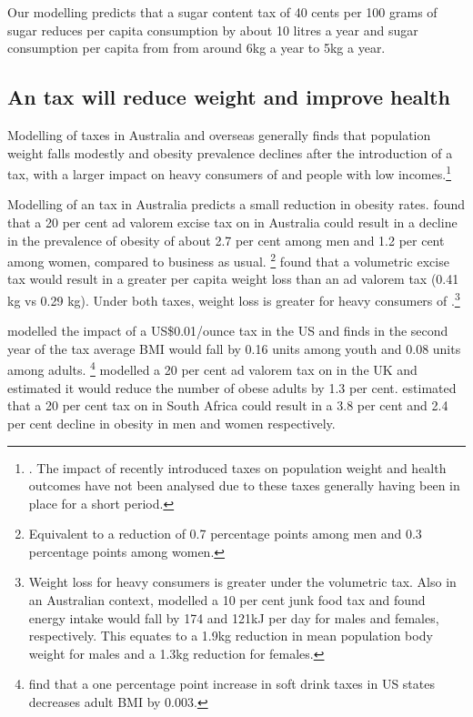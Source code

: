 \documentclass[embargoed]{grattan}
\begin{document}
Our modelling predicts that a sugar content tax of 40 cents per 100 grams of sugar reduces per capita \SSB{} consumption by about 10 litres a year and sugar consumption per capita from \SSBs{} from around 6kg a year to 5kg a year.

\subsection{An \SSB{} tax will reduce weight and improve health}\label{an-ssb-tax-will-reduce-weight-and-improve-health}

Modelling of \SSB{} taxes in Australia and overseas generally finds that population weight falls modestly and obesity prevalence declines after the introduction of a tax, with a larger impact on heavy consumers of \SSBs{} and people with low incomes.\footnote{\textcites{Briggs2013Overallincomespecific}{Manyema2014potentialimpact20}{Organization2016FiscalPoliciesDiet}{Veerman2016ImpactTaxSugar}{Sharma2014effectstaxingsugarsweetened}{Andreyeva2011Estimatingpotentialtaxes}.
The impact of recently introduced \SSB{} taxes on population weight and health outcomes have not been analysed due to these taxes generally having been in place for a short period.}

Modelling of an \SSB{} tax in Australia predicts a small reduction in obesity rates. \textcite{Veerman2016ImpactTaxSugar} found that a 20 per cent ad valorem excise tax on \SSBs{} in Australia could result in a decline in the prevalence of obesity of about 2.7 per cent among men and 1.2 per cent among women, compared to business as usual.%
\footnote{Equivalent to a reduction of 0.7 percentage points among men and 0.3 percentage points among women.} 
\textcite{Sharma2014effectstaxingsugarsweetened} found that a volumetric excise tax would result in a greater per capita weight loss than an ad valorem tax (0.41 kg vs 0.29 kg).
Under both taxes, weight loss is greater for heavy consumers of \SSBs{}.\footnote{Weight loss for heavy consumers is greater under the volumetric tax. Also in an Australian context, \textcite{Sacks2011Statesshouldstand} modelled a 10 per cent junk food tax and found energy intake would fall by 174 and 121kJ per day for males and females, respectively.
This equates to a 1.9kg reduction in mean population body weight for males and a 1.3kg reduction for females.}

\textcite{Long2015Costeffectivenesssugar} modelled the impact of a US\$0.01/ounce \SSB{} tax in the US and finds in the second year of the tax average BMI would fall by 0.16 units among youth and 0.08 units among adults.%
\footnote{\textcite{Fletcher2010Cansoftdrink} find that a one percentage point increase in soft drink taxes in US states decreases adult BMI by 0.003.} \textcite{Briggs2013Overallincomespecific} modelled a 20 per cent ad valorem tax on \SSBs{} in the UK and estimated it would reduce the number of obese adults by 1.3 per cent. \textcite{Manyema2014potentialimpact20} estimated that a 20 per cent tax on \SSBs{} in South Africa could result in a 3.8 per cent and 2.4 per cent decline in obesity in men and women respectively.
\end{document}
